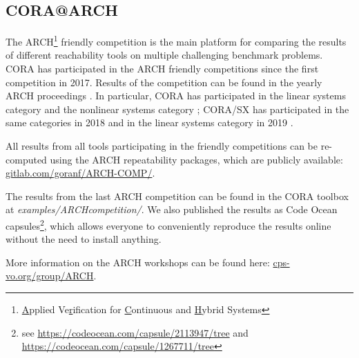 \subsection{CORA@ARCH} \label{sec:ARCH}

The ARCH\footnote{\underline{A}pplied Ve\underline{r}ification for \underline{C}ontinuous and \underline{H}ybrid Systems} friendly competition is the main platform for comparing the results of different reachability tools on multiple challenging benchmark problems. CORA has participated in the ARCH friendly competitions since the first competition in 2017. Results of the competition can be found in the yearly ARCH proceedings \cite{Frehse2017,Frehse2018,Frehse2019}. In particular, CORA has participated in the linear systems category \cite{Althoff2017b,Althoff2018c,Althoff2019b,Althoff2020a} and the nonlinear systems category \cite{Chen2017,Immler2018,Immler2019,Geretti2020}; CORA/SX has participated in the same categories in 2018 \cite{Althoff2018c,Immler2018} and in the linear systems category in 2019 \cite{Althoff2019b}.

All results from all tools participating in the friendly competitions can be re-computed using the ARCH repeatability packages, which are publicly available:
\href{https://gitlab.com/goranf/ARCH-COMP/}{gitlab.com/goranf/ARCH-COMP/}.

The results from the last ARCH competition can be found in the CORA toolbox at \textit{examples/ARCHcompetition/}. We also published the results as Code Ocean capsules\footnote{see \url{https://codeocean.com/capsule/2113947/tree} and \url{https://codeocean.com/capsule/1267711/tree}}, which allows everyone to conveniently reproduce the results online without the need to install anything.

More information on the ARCH workshops can be found here:
\href{http://cps-vo.org/group/ARCH}{cps-vo.org/group/ARCH}.